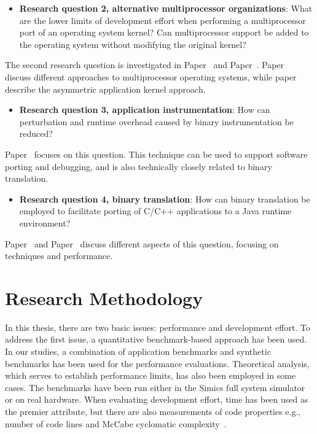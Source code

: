 \begin{itemize}
\item \textbf{Research question 2, alternative multiprocessor organizations}:
  What are the lower limits of development effort when performing a
  multiprocessor port of an operating system kernel?  Can multiprocessor
  support be added to the operating system without modifying the original
  kernel?
\end{itemize}

The second research question is investigated in Paper~
and Paper~. Paper~ discuss
different approaches to multiprocessor operating systems, while
paper~ describe the asymmetric application kernel
approach.

\begin{itemize}
\item \textbf{Research question 3, application instrumentation}: How can
  perturbation and runtime overhead caused by binary instrumentation be
  reduced?
\end{itemize}

Paper~ focuses on this question. This technique can be used to
support software porting and debugging, and is also technically closely
related to binary translation.

\begin{itemize}
\item \textbf{Research question 4, binary translation}: How can binary
  translation be employed to facilitate porting of C/C++ applications to a
  Java runtime environment?
\end{itemize}

Paper~ and Paper~ discuss
different aspects of this question, focusing on techniques and performance.

\section{Research Methodology}
\label{sec:intro:research_methodology}
In this thesis, there are two basic issues: performance and development
effort.  To address the first issue, a quantitative benchmark-based approach
has been used. In our studies, a combination of application benchmarks and
synthetic benchmarks has been used for the performance evaluations.
Theoretical analysis, which serves to establish performance limits, has also
been employed in some cases.  The benchmarks have been run either in the
Simics full system simulator~\cite{simics} or on real hardware.  When
evaluating development effort, time has been used as the premier attribute,
but there are also measurements of code properties e.g., number of code
lines and McCabe cyclomatic complexity~\cite{fenton98swmetrics}.

